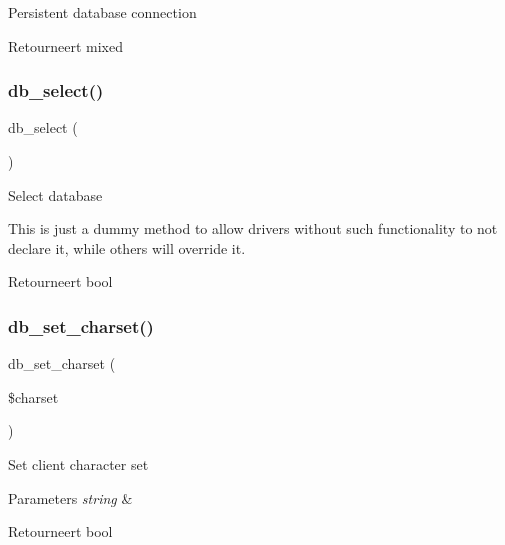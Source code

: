 Persistent database connection

\begin{DoxyReturn}{Retourneert}
mixed 
\end{DoxyReturn}
\mbox{\label{class_c_i___d_b__driver_af0c7f2602586ea2050b19fb36baefb24}} 
\subsubsection{\texorpdfstring{db\_select()}{db\_select()}}
{\footnotesize\ttfamily db\+\_\+select (\begin{DoxyParamCaption}{ }\end{DoxyParamCaption})}

Select database

This is just a dummy method to allow drivers without such functionality to not declare it, while others will override it.

\begin{DoxyReturn}{Retourneert}
bool 
\end{DoxyReturn}
\mbox{\label{class_c_i___d_b__driver_a66d47c23180629f6ccea934fd2ab6d0e}} 
\subsubsection{\texorpdfstring{db\_set\_charset()}{db\_set\_charset()}}
{\footnotesize\ttfamily db\+\_\+set\+\_\+charset (\begin{DoxyParamCaption}\item[{}]{\$charset }\end{DoxyParamCaption})}

Set client character set


\begin{DoxyParams}{Parameters}
{\em string} & \\
\hline
\end{DoxyParams}
\begin{DoxyReturn}{Retourneert}
bool 
\end{DoxyReturn}
\mbox{\label{class_c_i___d_b__driver_a1ca178ae41a8c6c0e461dfb2653cfd81}} 
